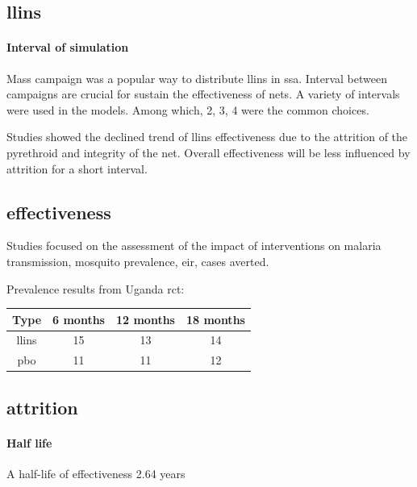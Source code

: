 \documentclass[a4paper, 12pt, twoside]{article}
\begin{document}
\subsection{\texorpdfstring{\gls{llins}}{LLINs}}%
\label{sub:llins}

\paragraph{Interval of simulation}%
\label{par:interval_of_simulation}
Mass campaign was a popular way to distribute \gls{llins} in \gls{ssa}.
Interval between campaigns are crucial for sustain the effectiveness of nets.
A variety of intervals were used in the models.
Among which, 2, 3, 4\cite{Walker2016} were the common choices.

Studies showed the declined trend of \gls{llins} effectiveness due to the attrition of the pyrethroid and integrity of the net.
Overall effectiveness will be less influenced by attrition for a short interval.

\subsection{effectiveness}
Studies focused on the assessment of the impact of interventions on malaria transmission, mosquito prevalence, \gls{eir}, cases averted.

Prevalence results from Uganda \gls{rct}\cite{Staedke2020}:
\begin{center}
	\begin{tabular}{c c c c}
		Type        & 6 months & 12 months & 18 months \\
		\hline
		\gls{llins} & 15       & 13        & 14        \\
		\gls{pbo}   & 11       & 11        & 12        \\
	\end{tabular}
\end{center}

\subsection{attrition}

\paragraph{Half life}%
\label{par:half_life}

A half-life of effectiveness 2.64 years
\end{document}
